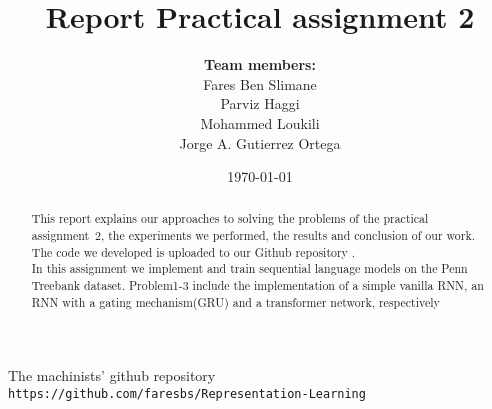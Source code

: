 \documentclass[a4paper]{article}
\title{Report Practical assignment 2}
\author{\textbf{Team members:}\\
Fares Ben Slimane \\
Parviz Haggi \\
Mohammed Loukili \\
Jorge A. Gutierrez Ortega
}
\date{\today}
\begin{document}
\maketitle

\begin{abstract}
This report explains our approaches to solving the problems of the practical assignment~2, the experiments we performed, the results and conclusion of our work. The code we developed is uploaded to our Github repository \cite{github}.\\
In this assignment we implement and train sequential language models on the Penn Treebank dataset. Problem1-3 include the implementation of a simple vanilla RNN, an RNN with a gating mechanism(GRU) and a transformer network, respectively
\end{abstract}








 \newpage
\begin{thebibliography}{9}
The machinists' github repository
\\\texttt{https://github.com/faresbs/Representation-Learning}
\end{thebibliography}
\end{document}
